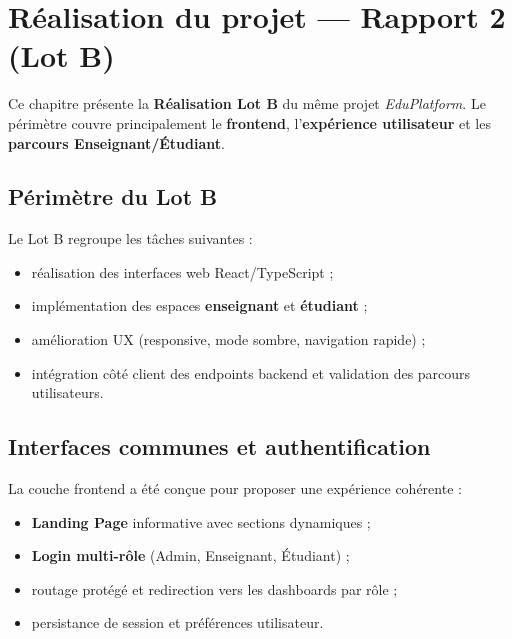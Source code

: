 \chapter{Réalisation du projet — Rapport 2 (Lot B)}

Ce chapitre présente la \textbf{Réalisation Lot B} du même projet \textit{EduPlatform}. Le périmètre couvre principalement le \textbf{frontend}, l'\textbf{expérience utilisateur} et les \textbf{parcours Enseignant/Étudiant}.

\section{Périmètre du Lot B}

Le Lot B regroupe les tâches suivantes :
\begin{itemize}[noitemsep]
    \item réalisation des interfaces web React/TypeScript ;
    \item implémentation des espaces \textbf{enseignant} et \textbf{étudiant} ;
    \item amélioration UX (responsive, mode sombre, navigation rapide) ;
    \item intégration côté client des endpoints backend et validation des parcours utilisateurs.
\end{itemize}

\section{Interfaces communes et authentification}

La couche frontend a été conçue pour proposer une expérience cohérente :
\begin{itemize}[noitemsep]
    \item \textbf{Landing Page} informative avec sections dynamiques ;
    \item \textbf{Login multi-rôle} (Admin, Enseignant, Étudiant) ;
    \item routage protégé et redirection vers les dashboards par rôle ;
    \item persistance de session et préférences utilisateur.
\end{itemize}

